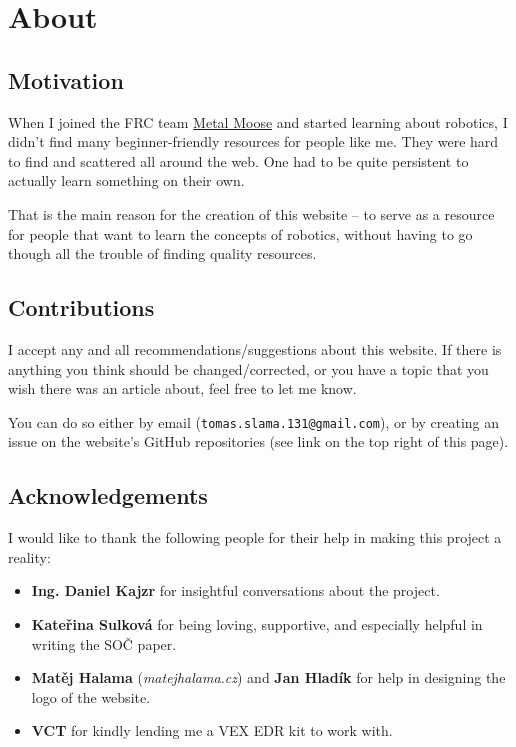 \documentclass[12pt,twoside]{article}
\begin{document}
\section{About}





\subsection{Motivation}
When I joined the FRC team \href{https://www.metalmoose.org/}{Metal Moose} and started learning about robotics, I didn't find many beginner-friendly resources for people like me. They were hard to find and scattered all around the web. One had to be quite persistent to actually learn something on their own.

That is the main reason for the creation of this website -- to serve as a resource for people that want to learn the concepts of robotics, without having to go though all the trouble of finding quality resources.


\subsection{Contributions}
I accept any and all recommendations/suggestions about this website. If there is anything you think should be changed/corrected, or you have a topic that you wish there was an article about, feel free to let me know.

You can do so either by email (\texttt{tomas.slama.131@gmail.com}), or by creating an issue on the website's GitHub repositories (see link on the top right of this page).


\subsection{Acknowledgements}
I would like to thank the following people for their help in making this project a reality:
\begin{itemize}
\item \textbf{Ing. Daniel Kajzr} for insightful conversations about the project.
\item \textbf{Kateřina Sulková} for being loving, supportive, and especially helpful in writing the SOČ paper.
\item \textbf{Matěj Halama} (\textit{matejhalama.cz}) and \textbf{Jan Hladík} for help in designing the logo of the website.
\item \textbf{VCT} for kindly lending me a VEX EDR kit to work with.
\end{itemize}\vspace{\parskip}
\end{document}
